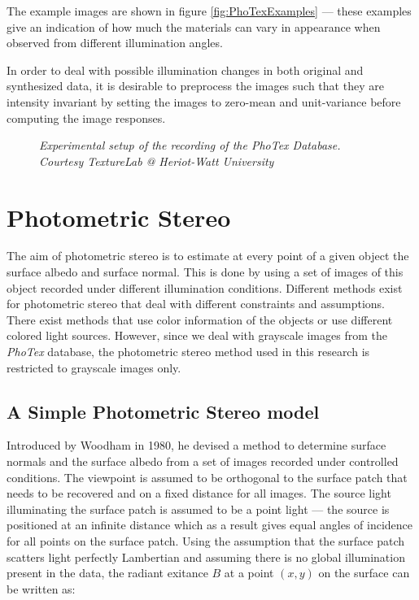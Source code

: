 The example images are shown in figure \ref{fig:PhoTexExamples} --- these examples give an indication of how much the materials can vary in appearance when observed from different illumination angles.

In order to deal with possible illumination changes in both original and synthesized data, it is desirable to preprocess the images such that they are intensity invariant by setting the images to zero-mean and unit-variance before computing the image responses. 

\begin{figure}[htbp!]
	\begin{center}
	\end{center}
	\caption{{ \it Experimental setup of the recording of the PhoTex Database. Courtesy TextureLab @ Heriot-Watt University}}
	\label{fig:PHOTEX_SETUP}
\end{figure}

\section{Photometric Stereo}\label{sec:PhotometricStereo}
The aim of photometric stereo is to estimate at every point of a given object the surface albedo and surface normal. This is done by using a set of images of this object recorded under different illumination conditions. Different methods exist for photometric stereo that deal with different constraints and assumptions. There exist methods that use color information of the objects or use different colored light sources. However, since we deal with grayscale images from the {\it PhoTex} database, the photometric stereo method used in this research is restricted to grayscale images only.

\subsection{A Simple Photometric Stereo model}\label{sec:SimplePhotometricStereo}
Introduced by Woodham \cite{Woodham} in 1980, he devised a method to determine surface normals and the surface albedo from a set of images recorded under controlled conditions. The viewpoint is assumed to be orthogonal to the surface patch that needs to be recovered and on a fixed distance for all images. The source light illuminating the surface patch is assumed to be a point light --- the source is positioned at an infinite distance which as a result gives equal angles of incidence for all points on the surface patch. Using the assumption that the surface patch scatters light perfectly Lambertian and assuming there is no global illumination present in the data, the radiant exitance $B$ at a point $(x, y)$ on the surface can be written as:

